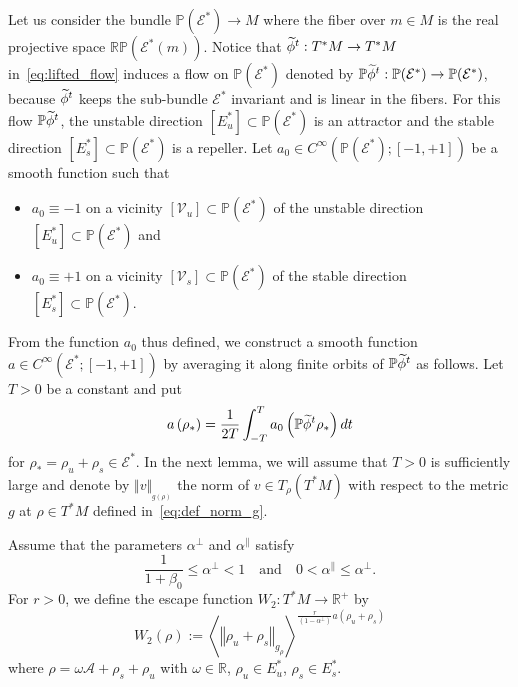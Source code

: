 \documentclass[AHL,Unicode,longabstracts,published]{cedram}
\newcommand{\clV}{\mathcal{V}}
\newcommand{\clE}{\mathcal{E}}
\newcommand{\bbR}{\mathbb{R}}
\newcommand{\bbP}{\mathbb{P}}
\newcommand{\bbRP}{\mathbb{RP}}
\newcommand{\scrA}{\mathscr{A}}
\let\oldtilde\tilde
\renewcommand*{\tilde}[1]{\mathchoice{\widetilde{#1}}{\widetilde{#1}}{\oldtilde{#1}}{\oldtilde{#1}}}
\newcommand{\bbR}{\mathbb{R}}
\begin{document}
Let us consider the bundle $\bbP(\clE^{*})\rightarrow M$ where the fiber over $m\in M$ is the real projective space $\bbRP(\clE^{*}(m))$. Notice that $\tilde{\phi}^{t}:T^{*}M\rightarrow T^{*}M$ in~\eqref{eq:lifted_flow} induces a flow on $\bbP(\clE^{*})$ denoted by $\bbP\tilde{\phi}^{t}:\bbP(\clE^{*})\to\bbP(\clE^{*})$, because $\tilde{\phi}^{t}$ keeps the sub-bundle $\clE^{*}$ invariant and is linear in the fibers. For this flow $\bbP\tilde{\phi}^{t}$, the unstable direction $[E_{u}^{*}]\subset\bbP(\clE^{*})$ is an attractor and the stable direction $[E_{s}^{*}]\subset\bbP(\clE^{*})$ is a repeller. Let $a_{0}\in C^{\infty}(\bbP(\clE^{*});[-1,+1])$ be a smooth function such that
\begin{itemize}
\item $a_{0}\equiv-1$ on a vicinity $[\clV_{u}]\subset\bbP(\clE^{*})$ of the unstable direction $[E_{u}^{*}]\subset\bbP(\clE^{*})$ and
\item $a_{0}\equiv+1$ on a vicinity $[\clV_{s}]\subset\bbP(\clE^{*})$ of the stable direction $[E_{s}^{*}]\subset\bbP(\clE^{*})$.
\end{itemize}
From the function $a_{0}$ thus defined, we construct a smooth function $a\in C^{\infty}(\clE^{*};[-1,+1])$ by averaging it along finite orbits of $\bbP\tilde{\phi}^{t}$ as follows. Let $T>0$ be a constant and put
\begin{equation}\label{eq:def_a_T}
a\left(\rho_{*}\right)=\frac{1}{2T}\int_{-T}^{T}a_{0}\left(\bbP\tilde{\phi}^{t}\rho_{*}\right)dt
\end{equation}
for $\rho_{*}=\rho_{u}+\rho_{s}\in\clE^{*}$. In the next lemma, we will assume that $T>0$ is sufficiently large and denote by $\Vert v\Vert _{_{g(\rho)}}$ the norm of $v\in T_{\rho}(T^{*}M)$ with respect to the metric $g$ at $\rho\in T^{*}M$ defined in~\eqref{eq:def_norm_g}.

\begin{cBoxA}{}
\begin{defi}\label{lem:W1}
Assume that the parameters $\alpha^{\perp}$ and $\alpha^{\parallel}$ satisfy
\[
\frac{1}{1+\beta_{0}}\leq\alpha^{\perp}<1\quad\text{and}\quad0<\alpha^{\parallel}\leq\alpha^{\perp}.
\]
For $r>0$, we define the escape function $W_{2}:T^{*}M\rightarrow\bbR^{+}$ by
\begin{equation}\label{eq:def_W-1}
W_{2}\left(\rho\right):=\left\langle \left\Vert \rho_{u}+\rho_{s}\right\Vert _{g_{\rho}}\right\rangle ^{\frac{r}{\left(1-\alpha^{\perp}\right)}a\left(\rho_{u}+\rho_{s}\right)}
\end{equation}
where $\rho=\omega\scrA+\rho_{s}+\rho_{u}$ with $\omega\in\bbR$, $\rho_{u}\in E_{u}^{*}$, $\rho_{s}\in E_{s}^{*}$.
\end{defi}
\end{cBoxA}
\end{document}
